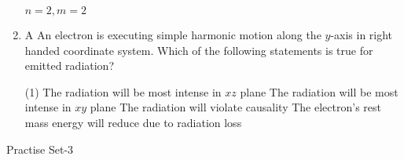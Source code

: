 \begin{enumerate}
\begin{tasks}
	\task[\textbf{d.}]$n=2, m=2$
\end{tasks}
\item A An electron is executing simple harmonic motion along the $y$-axis in right handed coordinate system. Which of the following statements is true for emitted radiation?
{}
 \begin{tasks}(1)
	\task[\textbf{a.}]The radiation will be most intense in $x z$ plane
	\task[\textbf{b.}] The radiation will be most intense in $x y$ plane
	\task[\textbf{c.}]The radiation will violate causality
	\task[\textbf{d.}] The electron's rest mass energy will reduce due to radiation loss
\end{tasks}
\end{enumerate}



\newpage
\begin{abox}
	Practise Set-3
\end{abox}
